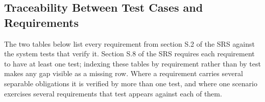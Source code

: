 \documentclass[12pt, titlepage]{article}
\begin{document}
\subsection{Traceability Between Test Cases and Requirements}
\label{sec:fr-trace}

The two tables below list every requirement from section S.2 of the SRS \citep{SRS} against the system tests
that verify it. Section S.8 of the SRS requires each requirement to have at least one test; indexing these
tables by requirement rather than by test makes any gap visible as a missing row. Where a requirement carries
several separable obligations it is verified by more than one test, and where one scenario exercises several
requirements that test appears against each of them.

\begingroup
\small
\renewcommand{\arraystretch}{1.2}
\end{document}
